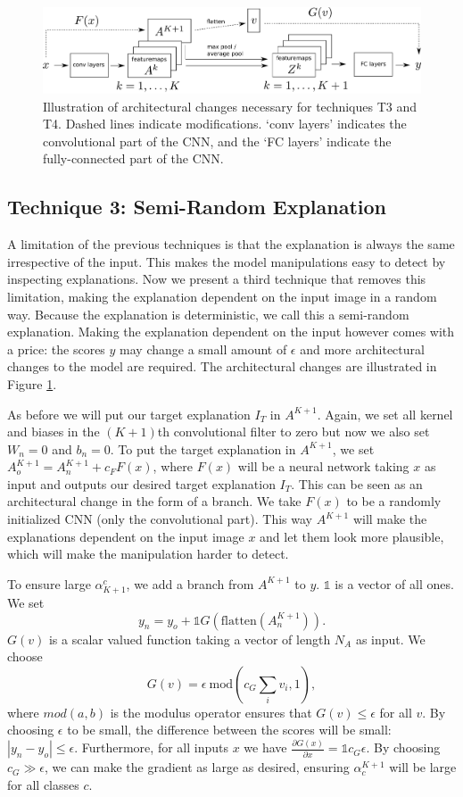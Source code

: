 \documentclass{article}
\begin{document}
\begin{figure}[htb]
    \centering
    \includegraphics[width = 0.95 \textwidth]{architecture2.pdf}
    \caption{Illustration of architectural changes necessary for techniques T3 and T4. Dashed lines indicate modifications. `conv layers' indicates the convolutional part of the CNN, and the `FC layers' indicate the fully-connected part of the CNN.}
    \label{fig_T34_architecture}
\end{figure}


\subsection{Technique 3: Semi-Random Explanation}

A limitation of the previous techniques is that the explanation is always the same irrespective of the input. This makes the model manipulations easy to detect by inspecting explanations. Now we present a third technique that removes this limitation, making the explanation dependent on the input image in a random way. Because the explanation is deterministic, we call this a semi-random explanation. Making the explanation dependent on the input however comes with a price: the scores $y$ may change a small amount of $\epsilon$ and more architectural changes to the model are required. The architectural changes are illustrated in Figure \ref{fig_T34_architecture}.

As before we will put our target explanation $I_T$ in $A^{K+1}$. Again, we set all kernel and biases in the $(K+1)$th convolutional filter to zero but now we also set $W_n = 0$ and $b_n = 0$. To put the target explanation in $A^{K+1}$, we set $A^{K+1}_o = A^{K+1}_n + c_F F(x)$, where $F(x)$ will be a neural network taking $x$ as input and outputs our desired target explanation $I_T$. This can be seen as an architectural change in the form of a branch. We take $F(x)$ to be a randomly initialized CNN (only the convolutional part). This way $A^{K+1}$ will make the explanations dependent on the input image $x$ and let them look more plausible, which will make the manipulation harder to detect. 

To ensure large $\alpha_{K+1}^c$, we add a branch from $A^{K+1}$ to $y$. $\mathbb{1}$ is a vector of all ones. We set $$y_n = y_o + \mathbb{1} G(\text{flatten}(A^{K+1}_n)).$$ $G(v)$ is a scalar valued function taking a vector of length $N_A$ as input. We choose $$G(v) = \epsilon~ \text{mod}(c_G \sum_i v_i, 1),$$ where $mod(a,b)$ is the modulus operator ensures that $G(v) \leq \epsilon$ for all $v$. By choosing $\epsilon$ to be small, the difference between the scores will be small: $|y_n - y_o| \leq \epsilon$.
Furthermore, for all inputs $x$ we have $\frac{\partial G(x)}{\partial x} = \mathbb{1} c_G \epsilon$. By choosing $c_G \gg \epsilon$, we can make the gradient as large as desired, ensuring $\alpha^{K+1}_c$ will be large for all classes $c$. 
\end{document}
